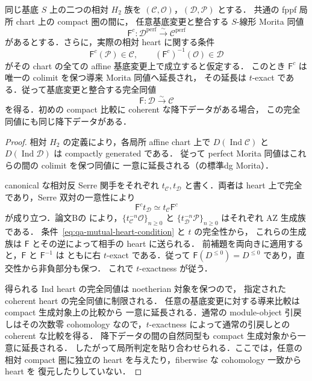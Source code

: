 \begin{proposition}
\label{prop:qa-h2-mutual-markings-heart-test}
同じ基底 $S$ 上の二つの相対 $H_2$ 族を
$(\mathcal C,\mathcal O)$，$(\mathcal D,\mathcal P)$ とする．
共通の fppf 局所 chart 上の compact 圏の間に，
任意基底変更と整合する $S$-線形 Morita 同値
\[
 \mathsf F^c:\mathcal D^{\mathrm{perf}}\xrightarrow{\sim}
                  \mathcal C^{\mathrm{perf}}
\]
があるとする．さらに，実際の相対 heart に関する条件
\[
 \mathsf F^c(\mathcal P)\in\mathcal C,
 \qquad
 (\mathsf F^c)^{-1}(\mathcal O)\in\mathcal D
 \tag{MH}\label{eq:qa-mutual-heart-condition}
\]
がその chart の全ての affine 基底変更上で成立すると仮定する．
このとき $\mathsf F^c$ は唯一の colimit を保つ導来 Morita 同値へ延長され，
その延長は $t$-exact である．従って基底変更と整合する完全同値
\[
 \mathsf F:\mathcal D\xrightarrow{\sim}\mathcal C
\]
を得る．初めの compact 比較に coherent な降下データがある場合，
この完全同値にも同じ降下データがある．
\end{proposition}
\begin{proof}
相対 $H_2$ の定義により，各局所 affine chart 上で
$D(\operatorname{Ind}\mathcal C)$ と
$D(\operatorname{Ind}\mathcal D)$ は compactly generated である．
従って perfect Morita 同値はこれらの間の colimit を保つ同値に
一意に延長される（\cite[\S4.3,\S8.2]{Keller1994}の標準dg Morita）．

canonical な相対反 Serre 関手をそれぞれ $t_{\mathcal C},t_{\mathcal D}$
と書く．両者は heart 上で完全であり，Serre 双対の一意性により
\[
 \mathsf F^c t_{\mathcal D}\simeq
 t_{\mathcal C}\mathsf F^c
\]
が成り立つ．論文Bの
\cite[\texttt{prop:relative-h2-antiserre-reconstruction}]{QuadricModuli2026}
により，$\{t_{\mathcal C}^{-n}\mathcal O\}_{n\geq0}$ と
$\{t_{\mathcal D}^{-n}\mathcal P\}_{n\geq0}$ はそれぞれ AZ 生成族である．
条件~\eqref{eq:qa-mutual-heart-condition} と $t$ の完全性から，
これらの生成族は $\mathsf F$ とその逆によって相手の heart に送られる．
前補題を両向きに適用すると，$\mathsf F$ と $\mathsf F^{-1}$ は
ともに右 $t$-exact である．従って
$\mathsf F(D^{\leq0})=D^{\leq0}$ であり，直交性から非負部分も保つ．
これで $t$-exactness が従う．

得られる Ind heart の完全同値は noetherian 対象を保つので，
指定された coherent heart の完全同値に制限される．
任意の基底変更に対する導来比較は compact 生成対象上の比較から
一意に延長される．通常の module-object 引戻しはその次数零 cohomology
なので，$t$-exactness によって通常の引戻しとの coherent な比較を得る．
降下データの間の自然同型も compact 生成対象から一意に延長される．
したがって局所判定を貼り合わせられる．ここでは，任意の相対 compact
圏に独立の heart を与えたり，fiberwise な cohomology 一致から heart を
復元したりしていない．
\end{proof}

